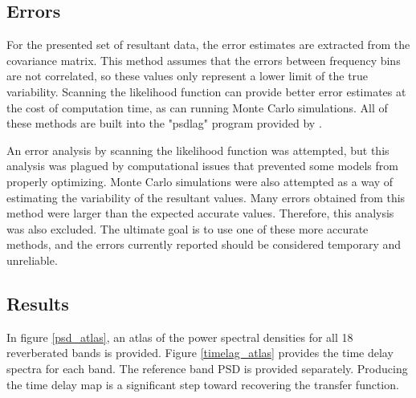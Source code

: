 \documentclass[11pt,letterpaper]{article}
\begin{document}
	\subsection{Errors}
	For the presented set of resultant data, the error estimates are extracted from the covariance matrix. This method assumes that the errors between frequency bins are not correlated, so these values only represent a lower limit of the true variability. Scanning the likelihood function can provide better error estimates at the cost of computation time, as can running Monte Carlo simulations. All of these methods are built into the "psdlag" program provided by \cite{2013ApJ...777...24Z}.

    An error analysis by scanning the likelihood function was attempted, but this analysis was plagued by computational issues that prevented some models from properly optimizing. Monte Carlo simulations were also attempted as a way of estimating the variability of the resultant values. Many errors obtained from this method were larger than the expected accurate values. Therefore, this analysis was also excluded. The ultimate goal is to use one of these more accurate methods, and the errors currently reported should be considered temporary and unreliable.

    \subsection{Results}
    \label{results}

    In figure \ref{psd_atlas}, an atlas of the power spectral densities for all 18 reverberated bands is provided. Figure \ref{timelag_atlas} provides the time delay spectra for each band. The reference band PSD is provided separately. Producing the time delay map is a significant step toward recovering the transfer function.
\end{document}
